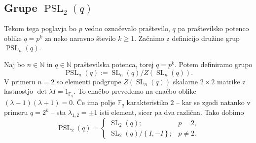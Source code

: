 \subsection{Grupe $\operatorname{PSL}_{2}(q)$}\label{sec_grupe_psl2q}

Tekom tega poglavja bo $p$ vedno označevalo praštevilo, $q$ pa praštevilsko potenco oblike $q = p^{k}$ za neko naravno število $k \ge $1. Začnimo z definicijo družine grup $\operatorname{PSL}_n(q)$.

\begin{definicija}\label{def_pslnq_in_psl2q}
    Naj bo $n \in \mathbb{N}$ in $q \in \mathbb{N}$ praštevilska potenca, torej $q = p^{k}$. Potem definiramo grupo \begin{equation*}
        \operatorname{PSL}_n(q) := {\operatorname{SL}_n(q)} / {Z(\operatorname{SL}_n(q))}.
     \end{equation*}   
    V primeru $n = 2$ so elementi podgrupe $Z(\operatorname{SL}_n(q))$ skalarne $2 \times 2$ matrike z lastnostjo $\det \lambda I = 1_{\mathbb{F}_q}$. To enačbo prevedemo na enačbo oblike $(\lambda - 1)(\lambda + 1) = 0$.
    Če ima polje $\mathbb{F}_q$ karakteristiko $2$ -- kar se zgodi natanko v primeru $q = 2^{k}$ -- sta $\lambda_{1,2} = \pm 1$ isti element, sicer pa dva različna. Tako dobimo
    \begin{equation*}
                \operatorname{PSL}_2(q) = \begin{cases}
                    \operatorname{SL}_2(q); & p = 2,  \\
                    {\operatorname{SL}_2(q)} / {\left\{ I, -I \right\} }; & p \neq 2.
                \end{cases}
             \end{equation*}   
    \end{definicija}
    
